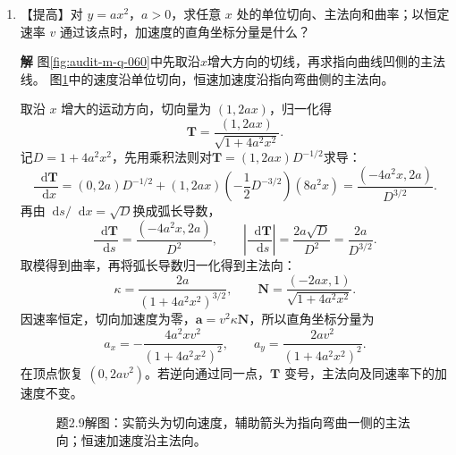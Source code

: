\documentclass[11pt,openany,fontset=fandol]{ctexbook}
\theoremstyle{plain}\newtheorem{theorem}{定理}[chapter]\newtheorem{proposition}[theorem]{命题}
\theoremstyle{definition}\newtheorem{definition}{定义}[chapter]\newtheorem{example}{例}[chapter]
\theoremstyle{remark}\newtheorem*{remark}{说明}
\newcommand{\SolutionStart}{\par\nobreak\medskip\nobreak\noindent\textbf{解}\quad\ignorespaces}
\newenvironment{solution}{\SolutionStart}{\par\medskip}
\newcommand{\dd}{\mathop{}\!\mathrm d}\newcommand{\ii}{\mathrm i}\newcommand{\ee}{\mathrm e}
\newcommand{\vct}[1]{\bm{#1}}\newcommand{\Rea}{\operatorname{Re}}\newcommand{\Ima}{\operatorname{Im}}
\begin{document}
\begin{enumerate}[label=2.\arabic*]
\begin{solution}
远处展开 $\sqrt{R^2+z^2}=z+R^2/(2z)+O(z^{-3})$，可得
\[
\Phi\sim\frac{\sigma R^2}{4\varepsilon_0z},\qquad
E_z\sim\frac{\sigma R^2}{4\varepsilon_0z^2}.
\]
它们均趋零，且等于总电荷 $\pi R^2\sigma$ 的点电荷首项。若固定 $z$ 让 $R\to\infty$，场有有限极限，电势却随 $R$ 发散；无限平面只能另选有限位置作零点。有限两点间电势差仍趋于 $-\sigma(z_2-z_1)/(2\varepsilon_0)$。

远处整盘可缩成一点电荷；靠近盘面时，各半径细环的贡献都要保留，所以不能用同一个点电荷近似。
\end{solution}

\item \begin{minipage}[t]{\linewidth}
【提高】对 $y=ax^2$，$a>0$，求任意 $x$ 处的单位切向、主法向和曲率；以恒定速率 $v$ 通过该点时，加速度的直角坐标分量是什么？

\end{minipage}

\begin{solution}
图\ref{fig:audit-m-q-060}中先取沿$x$增大方向的切线，再求指向曲线凹侧的主法线。
图\ref{fig:ex-2-9}中的速度沿单位切向，恒速加速度沿指向弯曲侧的主法向。

取沿 $x$ 增大的运动方向，切向量为 $(1,2ax)$，归一化得
\[
\vct T=\frac{(1,2ax)}{\sqrt{1+4a^2x^2}}.
\]
记$D=1+4a^2x^2$，先用乘积法则对$\vct T=(1,2ax)D^{-1/2}$求导：
\[\frac{\dd\vct T}{\dd x}
=(0,2a)D^{-1/2}+(1,2ax)\left(-\frac12D^{-3/2}\right)(8a^2x)
=\frac{(-4a^2x,2a)}{D^{3/2}}.\]
再由$\dd s/\dd x=\sqrt D$换成弧长导数，
\[\frac{\dd\vct T}{\dd s}=\frac{(-4a^2x,2a)}{D^2},\qquad
\left|\frac{\dd\vct T}{\dd s}\right|
=\frac{2a\sqrt D}{D^2}=\frac{2a}{D^{3/2}}.\]
取模得到曲率，再将弧长导数归一化得到主法向：
\[
\kappa=\frac{2a}{(1+4a^2x^2)^{3/2}},\qquad
\vct N=\frac{(-2ax,1)}{\sqrt{1+4a^2x^2}}.
\]
因速率恒定，切向加速度为零，$\vct a=v^2\kappa\vct N$，所以直角坐标分量为
\[
a_x=-\frac{4a^2xv^2}{(1+4a^2x^2)^2},\qquad
 a_y=\frac{2av^2}{(1+4a^2x^2)^2}.
\]
在顶点恢复 $(0,2av^2)$。若逆向通过同一点，$\vct T$ 变号，主法向及同速率下的加速度不变。

\begin{figure}[H]\centering
{}
\caption{题2.9解图：实箭头为切向速度，辅助箭头为指向弯曲一侧的主法向；恒速加速度沿主法向。}\label{fig:ex-2-9}
\end{figure}


\end{solution}
\end{enumerate}
\end{document}
